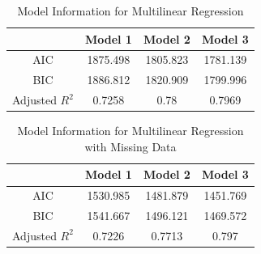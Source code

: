\begin{table}[ht]
 \begin{centering}
 \begin{tabular}{|c|c c c|} 
 \hline
   & Model 1 & Model 2 & Model 3 \\
 \hline
 AIC & 1875.498 & 1805.823 & 1781.139 \\
  \hline
 BIC & 1886.812 & 1820.909 & 1799.996 \\ 
  \hline
 Adjusted $R^{2}$ & 0.7258 & 0.78 & 0.7969\\ 
 \hline
 \end{tabular}
 \caption{Model Information for Multilinear Regression}
 \label{tab:model_info}
 \end{centering}
\end{table}

\begin{table}[ht]
 \begin{centering}
 \caption{Multilinear Regression for Predicting Temperature with Missing Data (Adjusted $R^{2} = 0.797$, $n = 260$)}
 \label{tab:lin_regression_missing_data}
 \end{centering}
\end{table}

\begin{table}[ht]
 \begin{centering}
 \begin{tabular}{|c|c c c|} 
 \hline
   & Model 1 & Model 2 & Model 3 \\
 \hline
 AIC & 1530.985 & 1481.879 & 1451.769 \\
  \hline
 BIC & 1541.667 & 1496.121 & 1469.572 \\ 
  \hline
 Adjusted $R^{2}$ & 0.7226 & 0.7713 & 0.797\\ 
 \hline
 \end{tabular}
 \caption{Model Information for Multilinear Regression with Missing Data}
 \label{tab:model_info_missing_data}
 \end{centering}
\end{table}